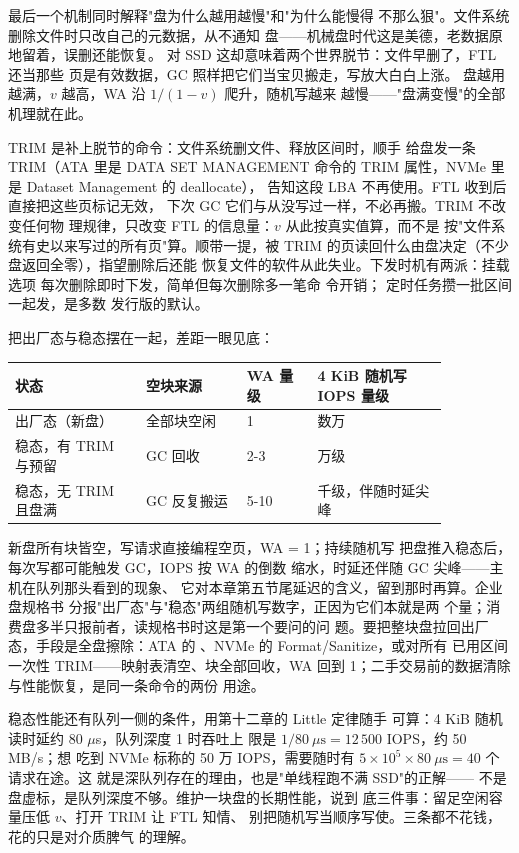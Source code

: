 最后一个机制同时解释"盘为什么越用越慢"和"为什么能慢得
不那么狠"。文件系统删除文件时只改自己的元数据，从不通知
盘——机械盘时代这是美德，老数据原地留着，误删还能恢复。
对 SSD 这却意味着两个世界脱节：文件早删了，FTL 还当那些
页是有效数据，GC 照样把它们当宝贝搬走，写放大白白上涨。
盘越用越满，$v$ 越高，WA 沿 $1/(1-v)$ 爬升，随机写越来
越慢——"盘满变慢"的全部机理就在此。

TRIM 是补上脱节的命令：文件系统删文件、释放区间时，顺手
给盘发一条 TRIM（ATA 里是 DATA SET MANAGEMENT 命令的
TRIM 属性，NVMe 里是 Dataset Management 的 deallocate），
告知这段 LBA 不再使用。FTL 收到后直接把这些页标记无效，
下次 GC 它们与从没写过一样，不必再搬。TRIM 不改变任何物
理规律，只改变 FTL 的信息量：$v$ 从此按真实值算，而不是
按"文件系统有史以来写过的所有页"算。顺带一提，被 TRIM
的页读回什么由盘决定（不少盘返回全零），指望删除后还能
恢复文件的软件从此失业。下发时机有两派：挂载选项
 每次删除即时下发，简单但每次删除多一笔命
令开销； 定时任务攒一批区间一起发，是多数
发行版的默认。

把出厂态与稳态摆在一起，差距一眼见底：

\begin{longtable}{L{0.26\linewidth}L{0.2\linewidth}L{0.14\linewidth}L{0.26\linewidth}}
\toprule
状态 & 空块来源 & WA 量级 & 4 KiB 随机写 IOPS 量级 \\
\midrule
出厂态（新盘） & 全部块空闲 & 1 & 数万 \\
稳态，有 TRIM 与预留 & GC 回收 & 2-3 & 万级 \\
稳态，无 TRIM 且盘满 & GC 反复搬运 & 5-10 & 千级，伴随时延尖峰 \\
\bottomrule
\end{longtable}

新盘所有块皆空，写请求直接编程空页，WA = 1；持续随机写
把盘推入稳态后，每次写都可能触发 GC，IOPS 按 WA 的倒数
缩水，时延还伴随 GC 尖峰——主机在队列那头看到的现象、
它对本章第五节尾延迟的含义，留到那时再算。企业盘规格书
分报"出厂态"与"稳态"两组随机写数字，正因为它们本就是两
个量；消费盘多半只报前者，读规格书时这是第一个要问的问
题。要把整块盘拉回出厂态，手段是全盘擦除：ATA 的
、NVMe 的 Format/Sanitize，或对所有
已用区间一次性 TRIM——映射表清空、块全部回收，WA 回到
1；二手交易前的数据清除与性能恢复，是同一条命令的两份
用途。

稳态性能还有队列一侧的条件，用第十二章的 Little 定律随手
可算：4 KiB 随机读时延约 80 $\mu$s，队列深度 1 时吞吐上
限是 $1/80\ \mu\mathrm{s}=12\,500$ IOPS，约 50 MB/s；想
吃到 NVMe 标称的 50 万 IOPS，需要随时有
$5\times10^{5}\times80\ \mu\mathrm{s}=40$ 个请求在途。这
就是深队列存在的理由，也是"单线程跑不满 SSD"的正解——
不是盘虚标，是队列深度不够。维护一块盘的长期性能，说到
底三件事：留足空闲容量压低 $v$、打开 TRIM 让 FTL 知情、
别把随机写当顺序写使。三条都不花钱，花的只是对介质脾气
的理解。

